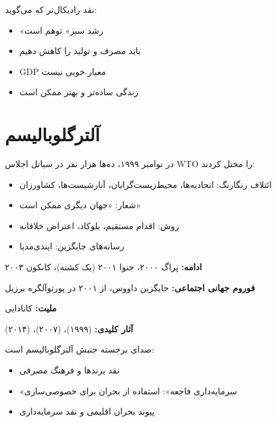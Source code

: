 \begin{defbox}
نقد رادیکال‌تر که می‌گوید:
\begin{itemize}[nosep]
    \item «رشد سبز» توهم است
    \item باید مصرف و تولید را کاهش دهیم
    \item GDP معیار خوبی نیست
    \item زندگی ساده‌تر و بهتر ممکن است
\end{itemize}
\end{defbox}

\section{آلترگلوبالیسم}

\begin{historybox}
در نوامبر ۱۹۹۹، ده‌ها هزار نفر در سیاتل اجلاس WTO را مختل کردند:
\begin{itemize}[nosep]
    \item ائتلاف رنگارنگ: اتحادیه‌ها، محیط‌زیست‌گرایان، آنارشیست‌ها، کشاورزان
    \item شعار: «جهان دیگری ممکن است»
    \item روش: اقدام مستقیم، بلوکاد، اعتراض خلاقانه
    \item رسانه‌های جایگزین: ایندی‌مدیا
\end{itemize}

\textbf{ادامه:} پراگ ۲۰۰۰، جنوا ۲۰۰۱ (یک کشته)، کانکون ۲۰۰۳

\textbf{فوروم جهانی اجتماعی:} جایگزین داووس، از ۲۰۰۱ در پورتوآلگره برزیل
\end{historybox}

\begin{personbox}

\textbf{ملیت:} کانادایی

\textbf{آثار کلیدی:}  (۱۹۹۹)،  (۲۰۰۷)،  (۲۰۱۴)

\mediumspace

 صدای برجسته جنبش آلترگلوبالیسم است:
\begin{itemize}[nosep]
    \item نقد برندها و فرهنگ مصرفی
    \item «سرمایه‌داری فاجعه»: استفاده از بحران برای خصوصی‌سازی
    \item پیوند بحران اقلیمی و نقد سرمایه‌داری
\end{itemize}
\end{personbox}

